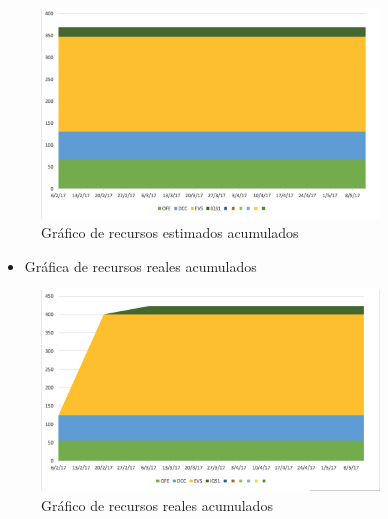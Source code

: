 \begin{figure}[H]
\begin{center}
\includegraphics[width=0.8\textwidth]{./img/estimados1.png}
\end{center}
\caption{Gráfico de recursos estimados acumulados}
\label{tab:dcufinal}
\end{figure}

\begin{itemize}
\item Gráfica de recursos reales acumulados
\end{itemize}

\begin{figure}[H]
\begin{center}
\includegraphics[width=0.8\textwidth]{./img/reales1.png}
\end{center}
\caption{Gráfico de recursos reales acumulados}
\label{tab:dcufinal}
\end{figure}

\newpage
